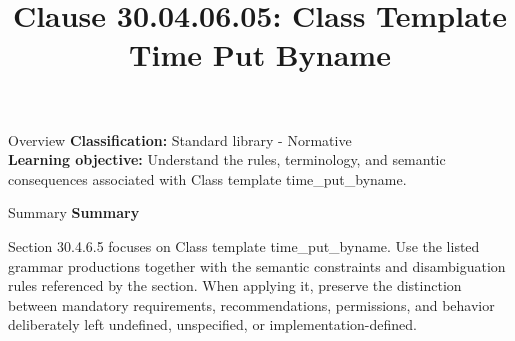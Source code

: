 \documentclass[10pt,letterpaper]{article}
\title{Clause 30.04.06.05: Class Template Time Put Byname}
\author{}
\date{}
\begin{document}
\maketitle
\begin{CornellOverviewBox}{Overview}
\textbf{Classification:} Standard library - Normative\\[2pt]
\textbf{Learning objective:} Understand the rules, terminology, and semantic consequences associated with Class template time\_put\_byname.
\end{CornellOverviewBox}\begin{CornellSummaryBox}{Summary}
{\sffamily\bfseries\color{Accent} Summary}\par\vspace{3pt}Section 30.4.6.5 focuses on Class template time\_put\_byname. Use the listed grammar productions together with the semantic constraints and disambiguation rules referenced by the section. When applying it, preserve the distinction between mandatory requirements, recommendations, permissions, and behavior deliberately left undefined, unspecified, or implementation-defined.
\end{CornellSummaryBox}
\end{document}
